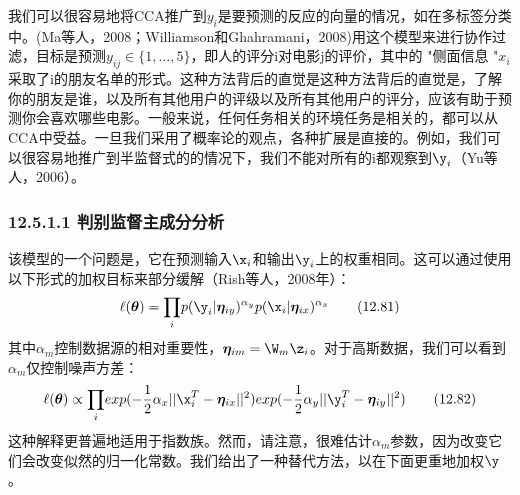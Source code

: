 \documentclass[a4paper]{article}
\begin{document}
我们可以很容易地将CCA推广到$y_i$是要预测的反应的向量的情况，如在多标签分类中。(Ma等人，2008；Williamson和Ghahramani，2008)用这个模型来进行协作过滤，目标是预测$y_{ij}\in \{1,...,5\}$，即人的评分i对电影j的评价，其中的 "侧面信息 "$x_i$采取了i的朋友名单的形式。这种方法背后的直觉是这种方法背后的直觉是，了解你的朋友是谁，以及所有其他用户的评级以及所有其他用户的评分，应该有助于预测你会喜欢哪些电影。一般来说，任何任务相关的环境任务是相关的，都可以从CCA中受益。一旦我们采用了概率论的观点，各种扩展是直接的。例如，我们可以很容易地推广到半监督式的的情况下，我们不能对所有的i都观察到$\y_i$（Yu等人，2006）。

\subsubsection*{12.5.1.1  判别监督主成分分析 }
该模型的一个问题是，它在预测输入$\x_i$和输出$\y_i$上的权重相同。这可以通过使用以下形式的加权目标来部分缓解（Rish等人，2008年）： 
\begin{equation}
	\ell (\boldsymbol{\theta})=\displaystyle{\prod_{i}}p(\y_i|\boldsymbol{\eta}_{iy})^{\alpha_y }p(\x_i|\boldsymbol{\eta}_{ix})^{\alpha_x}\tag{12.81}
\end{equation}
其中$\alpha_m$控制数据源的相对重要性，$\boldsymbol{\eta}_{im}=\W_m\z_i$。对于高斯数据，我们可以看到$\alpha_m$仅控制噪声方差： 
\begin{equation}
	\ell (\boldsymbol{\theta}) \propto \displaystyle{\prod_{i}} exp(-\frac{1}{2}\alpha_x||\x_i^T-\boldsymbol{\eta}_{ix}||^2)exp(-\frac{1}{2}\alpha_y||\y_i^T-\boldsymbol{\eta}_{iy}||^2)\tag{12.82}
\end{equation}
这种解释更普遍地适用于指数族。然而，请注意，很难估计$\alpha_m$参数，因为改变它们会改变似然的归一化常数。我们给出了一种替代方法，以在下面更重地加权$\y$。 
\end{document}

